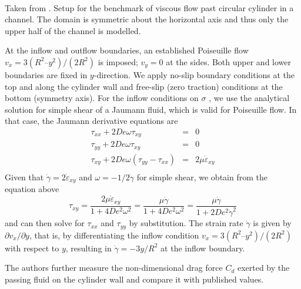 \begin{center}
\\
{\captionfont Taken from \textcite{bepo10}.
Setup for the benchmark of viscous flow past circular cylinder in a channel. 
The domain is symmetric about the horizontal axis and thus only the
upper half of the channel is modelled.
}
\end{center}


At the inflow and outflow boundaries, an established Poiseuille flow 
$v_x = 3(R^2 –y^2 )/(2R^2)$ is imposed; $v_y=0$ at
the sides. Both upper and lower boundaries are fixed in $y$-direction. We apply no-slip boundary conditions at the top and along the cylinder
wall and free-slip (zero traction) conditions at the bottom (symmetry axis). For the inflow conditions on $\sigma$ , we use the analytical solution for
simple shear of a Jaumann fluid, which is valid for Poiseuille flow. In that case, the Jaumann derivative equations are
\begin{eqnarray}
\tau_{xx}+2 De \omega \tau_{xy} &=& 0 \\
\tau_{yy}+2 De \omega \tau_{xy} &=& 0 \\
\tau_{xy}+2 De \omega (\tau_{yy}-\tau_{xx}) &=& 2 \mu \dot{\varepsilon}_{xy} \\
\end{eqnarray}
Given that $\dot\gamma = 2\dot\varepsilon_{xy}$ and $\omega = -1/2 \dot\gamma$ for simple shear, we obtain from the equation above
\[
\tau_{xy} = \frac{2 \mu \dot\varepsilon_{xy}}{1+4De^2\omega^2}
= \frac{\mu \dot\gamma}{1+4De^2\omega^2}
=\frac{\mu \dot\gamma}{1+2 De^2 \dot{\gamma}^2}
\]
and can then solve for $\tau_{xx}$ and $\tau_{yy}$ by substitution.
The strain rate $\dot\gamma$ is given by $\partial v_x /\partial y$, 
that is, by differentiating the inflow
condition $v_x = 3(R^2 –y^2 )/(2R^2)$ 
with respect to $y$, resulting in $\dot\gamma= -3y/R^2$ at the inflow boundary.

The authors further measure the non-dimensional drag force $C_d$ exerted by the passing fluid on the cylinder wall and compare it with published values.



